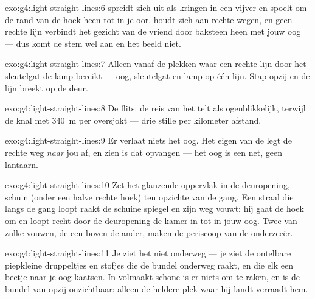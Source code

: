 \begin{solution}{exo:g4:light-straight-lines:6}
 spreidt zich uit als kringen in een vijver en spoelt om de
rand van de hoek heen tot in je oor.  houdt zich aan rechte
wegen, en geen rechte lijn verbindt het gezicht van de vriend door
baksteen heen met jouw oog --- dus komt de stem wel aan en het beeld
niet.
\end{solution}

\begin{solution}{exo:g4:light-straight-lines:7}
Alleen vanaf de plekken waar een rechte lijn door het sleutelgat de
lamp bereikt --- oog, sleutelgat en lamp op één lijn. Stap opzij en de
lijn breekt op de deur.
\end{solution}

\begin{solution}{exo:g4:light-straight-lines:8}
De flits: de reis van het  telt als ogenblikkelijk, terwijl de
knal met \qty{340}{m} per  oversjokt --- drie stille 
per kilometer afstand.
\end{solution}

\begin{solution}{exo:g4:light-straight-lines:9}
Er verlaat niets het oog. Het eigen  van de  legt de rechte
weg \emph{naar} jou af, en zien is dat opvangen --- het oog is een
net, geen lantaarn.
\end{solution}

\begin{solution}{exo:g4:light-straight-lines:10}
Zet het glanzende oppervlak in de deuropening, schuin (onder een halve
rechte hoek) ten opzichte van de gang. Een straal die langs de gang
loopt raakt de schuine spiegel en zijn weg vouwt: hij gaat de hoek om
en loopt recht door de deuropening de kamer in tot in jouw oog. Twee
van zulke vouwen, de een boven de ander, maken de periscoop van de
onderzeeër.
\end{solution}

\begin{solution}{exo:g4:light-straight-lines:11}
Je ziet het  niet onderweg --- je ziet de ontelbare piepkleine
druppeltjes en stofjes die de bundel onderweg raakt, en die elk een
beetje  naar je oog kaatsen. In volmaakt schone  is er
niets om te raken, en is de bundel van opzij onzichtbaar: alleen de
heldere plek waar hij landt verraadt hem.
\end{solution}
